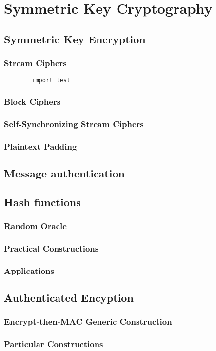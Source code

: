 \documentclass[10pt]{article}
\begin{document}
\section{Symmetric Key Cryptography}{
	\subsection{Symmetric Key Encryption}{
    \subsubsection{Stream Ciphers}{
      
      \begin{verbatim}
        import test
      \end{verbatim}
    }
    \subsubsection{Block Ciphers}{
    }
    \subsubsection{Self-Synchronizing Stream Ciphers}{
    }
    \subsubsection{Plaintext Padding}{
    }
	}
  \subsection{Message authentication}{
  }
  \subsection{Hash functions}{
    \subsubsection{Random Oracle}{
    }
    \subsubsection{Practical Constructions}{
    }
    \subsubsection{Applications}{
    }
  }
  \subsection{Authenticated Encyption}{
    \subsubsection{Encrypt-then-MAC Generic Construction}{
    }
    \subsubsection{Particular Constructions}{
    }
  }
}
\pagebreak
\end{document}

